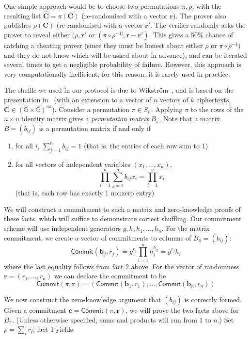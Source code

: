 \documentclass[12pt,a4paper]{article}
\theoremstyle{definition}
\begin{document}
One simple approach would be to choose two permutations $\pi,\rho$, with the resulting list $\mathbf{\hat{C}}=\pi(\mathbf{C})$ (re-randomised with a vector $\mathbf{r}$). The prover also publishes $\rho(\mathbf{C})$ (re-randomised with a vector $\mathbf{r'}$. The verifier randomly asks the prover to reveal either $(\rho, \mathbf{r'}$ or $(\pi\circ\rho^{-1]}, \mathbf{r}-\mathbf{r'})$. This gives a 50\% chance of catching a cheating prover (since they must be honest about either $\rho$ or $\pi\circ\rho^{-1})$ and they do not know which will be asked about in advance), and can be iterated several times to get a negligible probability of failure. However, this approach is very computationally inefficient; for this reason, it is rarely used in practice.

The shuffle we used in our protocol is due to Wikström~\cite{wikstrom2011implement}, and is based on the presentation in~\cite{haenni2017pseudo} (with an extension to a vector of $n$ vectors of $k$ ciphertexts, $\mathbf{C}\in(\mathbb{G}\times\mathbb{G})^{nk}$). Consider a permutation $\pi\in S_n$. Applying $\pi$ to the rows of the $n\times n$ identity matrix gives a \textit{permutation matrix} $B_\pi$. Note that a matrix $B=(b_{ij})$ is a permutation matrix if and only if
\begin{enumerate}
    \item for all $i$, $\sum_{j=1}^n b_{ij} = 1$ (that is, the entries of each row sum to 1)
    \item for all vectors of independent variables $(x_1,\ldots,x_n)$,
    $$\prod_{i=1}^n\sum_{j=1}^nb_{ij} x_i=\prod_{i=1}^n x_i$$
    (that is, each row has exactly 1 nonzero entry)
\end{enumerate}
We will construct a commitment to such a matrix and zero-knowledge proofs of these facts, which will suffice to demonstrate correct shuffling. Our commitment scheme will use independent generators $g, h, h_1, \ldots, h_n$. For the matrix commitment, we create a vector of commitments to columns of $B_\pi=(b_{ij})$:
$$\mathsf{Commit}(\mathbf{b}_j, r_j) = g^{r_j}\prod_{i=1}^n h_i^{b_{ij}} = g^{r_j}h_i$$
where the last equality follows from fact 2 above. For the vector of randomness $\mathbf{r}=(r_1,\ldots, r_n)$ we can declare the commitment to be
$$\mathsf{Commit}(\pi, \mathbf{r}) = (\mathsf{Commit}(\mathbf{b}_1, r_1),\ldots,\mathsf{Commit}(\mathbf{b}_n, r_n))$$

We now construct the zero-knowledge argument that $(b_{ij})$ is correctly formed. Given a commitment $\mathbf{c}=\mathsf{Commit}(\pi,\mathbf{r})$, we will prove the two facts above for $B_\pi$. (Unless otherwise specified, sums and products will run from 1 to $n$.) Set $\rho = \sum_i r_i$; fact 1 yields
\end{document}
